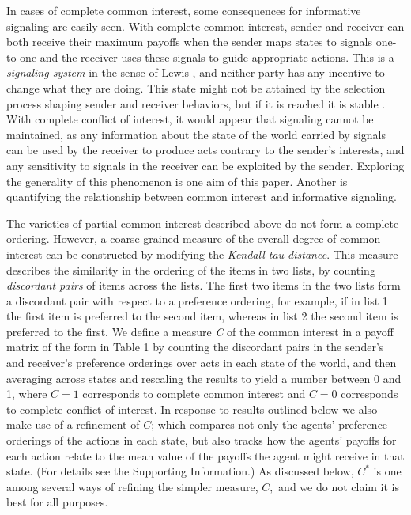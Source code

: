 \documentclass[10pt]{article}
\begin{document}
In cases of complete common interest, some consequences for informative
signaling are easily seen. With complete common interest, sender and
receiver can both receive their maximum payoffs when the sender maps
states to signals one-to-one and the receiver uses these signals to
guide appropriate actions. This is a \emph{signaling system} in the
sense of Lewis \cite{Lewis1969}, and neither party has any incentive to change what
they are doing. This state might not be attained by the selection
process shaping sender and receiver behaviors, but if it is reached it
is stable \cite{Huttegger2010}. With complete conflict of interest, it would appear that
signaling cannot be maintained, as any information about the state of
the world carried by signals can be used by the receiver to produce acts
contrary to the sender's interests, and any sensitivity to signals in
the receiver can be exploited by the sender. Exploring the generality of
this phenomenon is one aim of this paper. Another is quantifying the
relationship between common interest and informative signaling.

The varieties of partial common interest described above do not form a
complete ordering. However, a coarse-grained measure of the overall
degree of common interest can be constructed by modifying the
\emph{Kendall tau distance}. This measure describes the similarity in
the ordering of the items in two lists, by counting \emph{discordant
pairs} of items across the lists. The first two items in the two lists
form a discordant pair with respect to a preference ordering, for
example, if in list 1 the first item is preferred to the second item,
whereas in list 2 the second item is preferred to the first. We define a
measure \emph{C} of the common interest in a payoff matrix of the form
in Table 1 by counting the discordant pairs in the sender's and
receiver's preference orderings over acts in each state of the world, and
then averaging across states and rescaling the results to yield a number
between 0 and 1, where $C=1$ corresponds to complete common interest and
$C=0$ corresponds to complete conflict of interest. In response to
results outlined below we also make use of a refinement of $C$; which
compares not only the agents' preference orderings of the actions in
each state, but also tracks how the agents' payoffs for each action relate to the mean
value of the payoffs the agent might receive in that state. (For details see the Supporting Information.) As discussed below, $C^*$ is one
among several ways of refining the simpler measure, $C,$ and we do not
claim it is best for all purposes.
\end{document}
